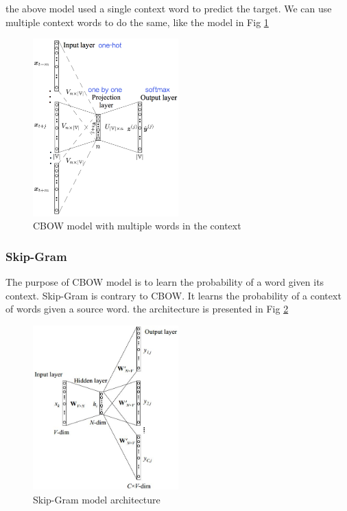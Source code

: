 \documentclass[a4paper,10pt]{article}
\begin{document}
the above model used a single context word to predict the target. We can use multiple context words to do the same, like the model in Fig \ref{Fig.multiple-cbow}

\begin{figure}[htpb]
\centering 
\includegraphics[width=0.5\textwidth]{report_image/mutiple-cbow.png} 
\caption{CBOW model with multiple words in the context} 
\label{Fig.multiple-cbow} 
\end{figure}

\subsubsection{Skip-Gram}
The purpose of CBOW model is to learn the probability of a word given its context. Skip-Gram is contrary to CBOW. It learns the 
probability of a context of words given a source word. the architecture is presented in Fig \ref{Fig.skip-gram}

\begin{figure}[htpb]
\centering 
\includegraphics[width=0.5\textwidth]{report_image/skip-gram.png} 
\caption{Skip-Gram model architecture} 
\label{Fig.skip-gram} 
\end{figure}
\end{document}
